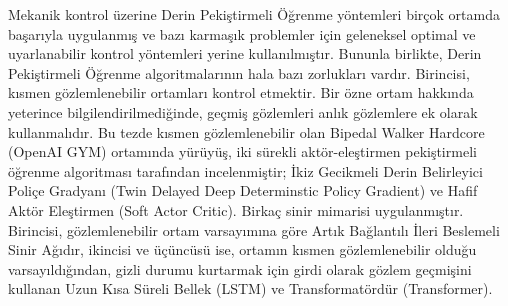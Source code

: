Mekanik kontrol üzerine Derin Pekiştirmeli Öğrenme yöntemleri birçok ortamda başarıyla uygulanmış ve bazı karmaşık problemler için geleneksel optimal ve uyarlanabilir kontrol yöntemleri yerine kullanılmıştır.
Bununla birlikte, Derin Pekiştirmeli Öğrenme algoritmalarının hala bazı zorlukları vardır.
Birincisi, kısmen gözlemlenebilir ortamları kontrol etmektir.
Bir özne ortam hakkında yeterince bilgilendirilmediğinde, geçmiş gözlemleri anlık gözlemlere ek olarak kullanmalıdır.
Bu tezde kısmen gözlemlenebilir olan Bipedal Walker Hardcore (OpenAI GYM) ortamında yürüyüş,
iki sürekli aktör-eleştirmen pekiştirmeli öğrenme algoritması tarafından incelenmiştir; İkiz Gecikmeli Derin Belirleyici Poliçe Gradyanı (Twin Delayed Deep Determinstic Policy Gradient) ve Hafif Aktör Eleştirmen (Soft Actor Critic).
Birkaç sinir mimarisi uygulanmıştır.
Birincisi, gözlemlenebilir ortam varsayımına göre Artık Bağlantılı İleri Beslemeli Sinir Ağıdır,
ikincisi ve üçüncüsü ise, ortamın kısmen gözlemlenebilir olduğu varsayıldığından, gizli durumu kurtarmak için girdi olarak gözlem geçmişini kullanan Uzun Kısa Süreli Bellek (LSTM) ve Transformatördür (Transformer).